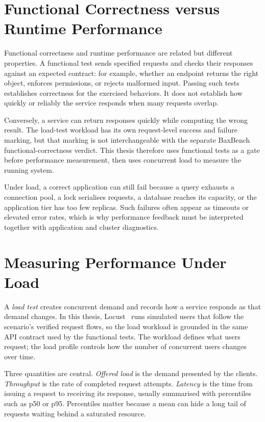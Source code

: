 \section{Functional Correctness versus Runtime Performance}
\label{sec:background-correctness-vs-performance}

Functional correctness and runtime performance are related but different
properties. A functional test sends specified requests and checks their
responses against an expected contract: for example, whether an endpoint
returns the right object, enforces permissions, or rejects malformed input.
Passing such tests establishes correctness for the exercised behaviors. It
does not establish how quickly or reliably the service responds when many
requests overlap.

Conversely, a service can return responses quickly while computing the wrong
result. The load-test workload has its own request-level success and failure
marking, but that marking is not interchangeable with the separate BaxBench
functional-correctness verdict. This thesis therefore uses functional tests as
a gate before performance measurement, then uses concurrent load to measure
the running system.

Under load, a correct application can still fail because a query exhausts a
connection pool, a lock serialises requests, a database reaches its capacity,
or the application tier has too few replicas. Such failures often appear as
timeouts or elevated error rates, which is why performance feedback must be
interpreted together with application and cluster diagnostics.


\section{Measuring Performance Under Load}
\label{sec:background-goodput}

A \emph{load test} creates concurrent demand and records how a service responds
as that demand changes. In this thesis, Locust~\cite{locust} runs simulated
users that follow the scenario's verified request flows, so the load workload
is grounded in the same API contract used by the functional tests. The
workload defines what users request; the load profile controls how the number
of concurrent users changes over time.

Three quantities are central. \emph{Offered load} is the demand presented by
the clients. \emph{Throughput} is the rate of completed request attempts.
\emph{Latency} is the time from issuing a request to receiving its response,
usually summarised with percentiles such as p50 or p95. Percentiles matter
because a mean can hide a long tail of requests waiting behind a saturated
resource.

